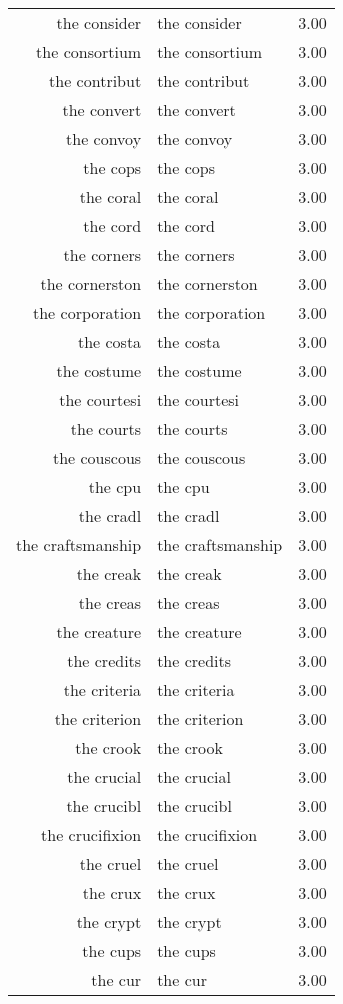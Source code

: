 \begin{table}[ht]
\begin{tabular}{rlr}
  the consider & the consider & 3.00 \\ 
  the consortium & the consortium & 3.00 \\ 
  the contribut & the contribut & 3.00 \\ 
  the convert & the convert & 3.00 \\ 
  the convoy & the convoy & 3.00 \\ 
  the cops & the cops & 3.00 \\ 
  the coral & the coral & 3.00 \\ 
  the cord & the cord & 3.00 \\ 
  the corners & the corners & 3.00 \\ 
  the cornerston & the cornerston & 3.00 \\ 
  the corporation & the corporation & 3.00 \\ 
  the costa & the costa & 3.00 \\ 
  the costume & the costume & 3.00 \\ 
  the courtesi & the courtesi & 3.00 \\ 
  the courts & the courts & 3.00 \\ 
  the couscous & the couscous & 3.00 \\ 
  the cpu & the cpu & 3.00 \\ 
  the cradl & the cradl & 3.00 \\ 
  the craftsmanship & the craftsmanship & 3.00 \\ 
  the creak & the creak & 3.00 \\ 
  the creas & the creas & 3.00 \\ 
  the creature & the creature & 3.00 \\ 
  the credits & the credits & 3.00 \\ 
  the criteria & the criteria & 3.00 \\ 
  the criterion & the criterion & 3.00 \\ 
  the crook & the crook & 3.00 \\ 
  the crucial & the crucial & 3.00 \\ 
  the crucibl & the crucibl & 3.00 \\ 
  the crucifixion & the crucifixion & 3.00 \\ 
  the cruel & the cruel & 3.00 \\ 
  the crux & the crux & 3.00 \\ 
  the crypt & the crypt & 3.00 \\ 
  the cups & the cups & 3.00 \\ 
  the cur & the cur & 3.00 \\ 

\end{tabular}
\end{table}
